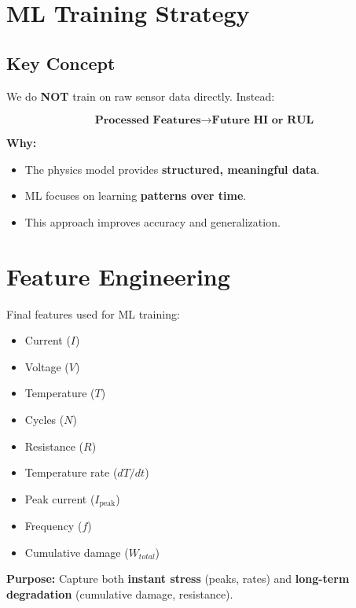 \documentclass[12pt]{article}
\begin{document}

\section{ML Training Strategy}

\subsection{Key Concept}

We do \textbf{NOT} train on raw sensor data directly. Instead:

\[
\textbf{Processed Features} \rightarrow \textbf{Future HI or RUL}
\]

\textbf{Why:}
\begin{itemize}
  \item The physics model provides \textbf{structured, meaningful data}.
  \item ML focuses on learning \textbf{patterns over time}.
  \item This approach improves accuracy and generalization.
\end{itemize}


\section{Feature Engineering}

Final features used for ML training:

\begin{itemize}
  \item Current ($I$)
  \item Voltage ($V$)
  \item Temperature ($T$)
  \item Cycles ($N$)
  \item Resistance ($R$)
  \item Temperature rate ($dT/dt$)
  \item Peak current ($I_{\text{peak}}$)
  \item Frequency ($f$)
  \item Cumulative damage ($W_{total}$)
\end{itemize}

\textbf{Purpose:} Capture both \textbf{instant stress} (peaks, rates) and \textbf{long-term degradation} (cumulative damage, resistance).

\end{document}
